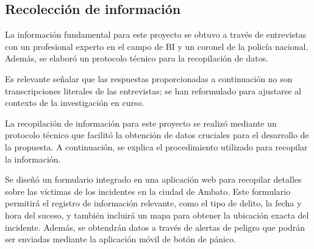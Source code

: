 \subsection{Recolección de información}

La información fundamental para este proyecto se obtuvo a través de entrevistas con un profesional experto
en el campo de BI y un coronel de la policía nacional. Además, se elaboró un protocolo técnico para la
recopilación de datos.
\bigbreak

Es relevante señalar que las respuestas proporcionadas a continuación no son transcripciones literales
de las entrevistas; se han reformulado para ajustarse al contexto de la investigación en curso.




La recopilación de información para este proyecto se realizó mediante un protocolo técnico que facilitó la
obtención de datos cruciales para el desarrollo de la propuesta. A continuación, se explica el procedimiento
utilizado para recopilar la información.
\bigbreak

Se diseñó un formulario integrado en una aplicación web para recopilar detalles sobre las víctimas de los incidentes
en la ciudad de Ambato. Este formulario permitirá el registro de información relevante, como el tipo de delito,
la fecha y hora del suceso, y también incluirá un mapa para obtener la ubicación exacta del incidente. Además,
se obtendrán datos a través de alertas de peligro que podrán ser enviadas mediante la aplicación móvil de botón de pánico.